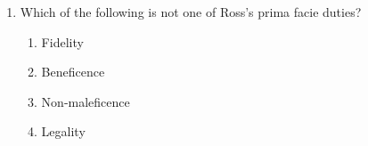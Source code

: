 \documentclass[12pt]{article}
\begin{document}
\begin{enumerate}[label=\arabic*.]
\begin{enumerate}[label=(\alph*)]
    \item both seek to provide us with true beliefs about the world.
    \item both are essential components of a worthwhile life.
    \item both involve testing general principles by examining their logical consequences.
    \item all of the above.
\end{enumerate}
\item Which of the following is not one of Ross's prima facie duties?
\begin{enumerate}[label=(\alph*)]
    \item Fidelity
    \item Beneficence
    \item Non-maleficence
    \item Legality
\end{enumerate}
\end{enumerate}
\end{document}
